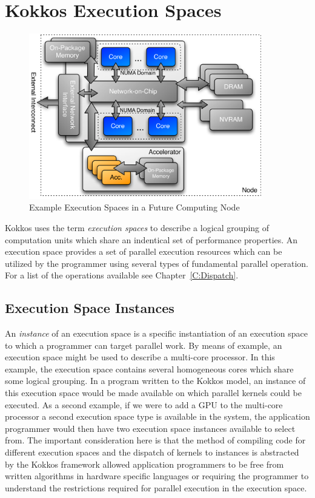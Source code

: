 \section{Kokkos Execution Spaces}

\begin{figure}
\begin{center}
\includegraphics[width=4in]{figures/kokkos-execution-space.pdf}
\caption{Example Execution Spaces in a Future Computing Node}
\label{fig:kokkos_execution_spaces}
\end{center}
\end{figure}

Kokkos uses the term {\em execution spaces} to describe a logical
grouping of computation units which share an indentical set of
performance properties. An execution space provides a set of 
parallel execution resources which can be utilized by the
programmer using several types of fundamental parallel
operation. For a list of the operations available see
Chapter~\ref{C:Dispatch}.

\subsection{Execution Space Instances}

An {\em instance} of an execution space is a specific instantiation
of an execution space to which a programmer can target parallel
work. By means of example, an execution space might be used
to describe a multi-core processor. In this example, the
execution space contains several homogeneous cores which share
some logical grouping. In a program written to the Kokkos model,
an instance of this execution space would be made available
on which parallel kernels could be executed. As a second example,
if we were to add a GPU to the multi-core processor a second
execution space type is available in the system, the 
application programmer would then have two 
execution space instances available to select from. The
important consideration here is that the method of
compiling code for different execution spaces and the
dispatch of kernels to instances is abstracted by the Kokkos
framework allowed application programmers to be free from 
written algorithms in hardware specific languages or
requiring the programmer to understand the restrictions
required for parallel execution in the execution space.

